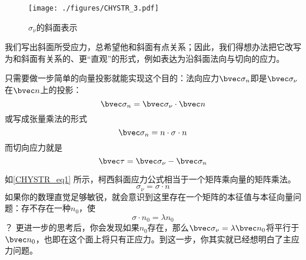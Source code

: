 \begin{figure}[ht]
\centering
\texttt{[image: ./figures/CHYSTR\_3.pdf]}
\caption{$\sigma_\nu$的斜面表示} \label{CHYSTR_fig3}
\end{figure}

我们写出斜面所受应力，总希望他和斜面有点关系；因此，我们得想办法把它改写为和斜面有关系的、更“直观”的形式，例如表达为沿斜面法向与切向的应力。

只需要做一步简单的向量投影就能实现这个目的：法向应力$\bvec \sigma_n$即是$\bvec \sigma_\nu$在$\bvec n$上的投影：
\begin{equation}
\bvec \sigma_n = \bvec \sigma_\nu \cdot \bvec n 
\end{equation}
或写成张量乘法的形式
\begin{equation}
\bvec \sigma_n = n \cdot \sigma \cdot n
\end{equation}
而切向应力就是
\begin{equation}
\bvec \tau = \bvec \sigma_\nu - \bvec \sigma_n
\end{equation}

如\autoref{CHYSTR_eq1} 所示，柯西斜面应力公式相当于一个矩阵乘向量的矩阵乘法。
$$\sigma_\nu = \sigma \cdot n$$
如果你的数理直觉足够敏锐，就会意识到这里存在一个矩阵的本征值与本征向量问题：存不存在一种$n_0$，使
$$
\sigma \cdot n_0 = \lambda n_0
$$？
更进一步的思考后，你会发现如果$n_0$存在，那么$\bvec \sigma_\nu = \lambda \bvec n_0$将平行于$\bvec n_0$，也即在这个面上将只有正应力。到这一步，你其实就已经想明白了主应力问题。

